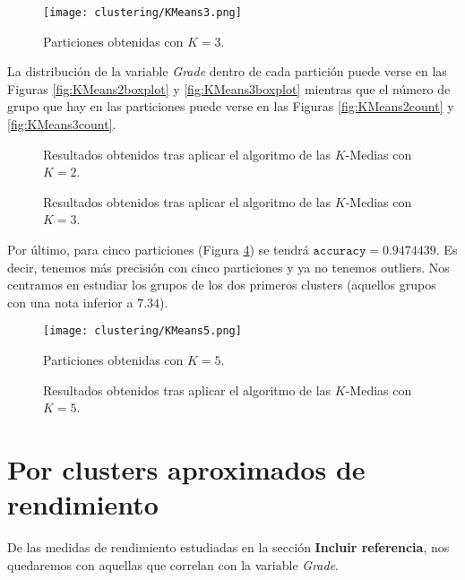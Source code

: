 \begin{figure}[H]
    \centering
    \texttt{[image: clustering/KMeans3.png]}
    \caption{Particiones obtenidas con $K = 3$.}
    \label{fig:KMeans3}
\end{figure}

La distribución de la variable \emph{Grade} dentro de cada partición puede verse en las Figuras \ref{fig:KMeans2boxplot} y \ref{fig:KMeans3boxplot} mientras que el número de grupo que hay en las particiones puede verse en las Figuras \ref{fig:KMeans2count} y \ref{fig:KMeans3count}.

\begin{figure}[H]
\centering
{}\qquad
{}%
\caption{Resultados obtenidos tras aplicar el algoritmo de las $K$-Medias con $K = 2$.}
\label{fig:KMeans2details}
\end{figure}

\begin{figure}[H]
\centering
{}\qquad
{}%
\caption{Resultados obtenidos tras aplicar el algoritmo de las $K$-Medias con $K = 3$.}
\label{fig:KMeans3details}
\end{figure}

Por último, para cinco particiones (Figura \ref{fig:KMeans5}) se tendrá $\texttt{accuracy} = 0.9474439$. Es decir, tenemos más precisión con cinco particiones y ya no tenemos outliers. Nos centramos en estudiar los grupos de los dos primeros clusters (aquellos grupos con una nota inferior a $7.34$).

\begin{figure}[H]
    \centering
    \texttt{[image: clustering/KMeans5.png]}
    \caption{Particiones obtenidas con $K = 5$.}
    \label{fig:KMeans5}
\end{figure}

\begin{figure}[H]
\centering
{}\qquad
{}%
\caption{Resultados obtenidos tras aplicar el algoritmo de las $K$-Medias con $K = 5$.}
\label{fig:KMeans5details}
\end{figure}

\section{Por clusters aproximados de rendimiento}

De las medidas de rendimiento estudiadas en la sección \textbf{Incluir referencia}, nos quedaremos con aquellas que correlan con la variable \emph{Grade}.
